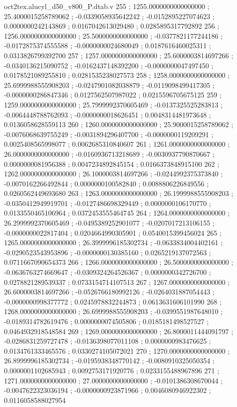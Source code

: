 \begin{filecontents}[overwrite]{oct2tex.alucyl_d50_v800_P.dtab.v}
255 ; 1255.0000000000000000 ; 25.4000015258789062 ; -0.0339058935642242 ; -0.0152895227074623 ; 0.0000000242143869 ; 0.0167042613029480 ; 0.0285895317792892
256 ; 1256.0000000000000000 ; 25.5000000000000000 ; -0.0377821177244186 ; -0.0172875374555588 ; -0.0000000024680049 ; 0.0187616460025311 ; 0.0313826799392700
257 ; 1257.0000000000000000 ; 25.6000003814697266 ; -0.0340136215090752 ; -0.0162437148392200 ; -0.0000000047497450 ; 0.0178521089255810 ; 0.0281535238027573
258 ; 1258.0000000000000000 ; 25.6999988555908203 ; -0.0247901082038879 ; -0.0119098499417305 ; -0.0000000286847346 ; 0.0127562507987022 ; 0.0215596705675125
259 ; 1259.0000000000000000 ; 25.7999992370605469 ; -0.0137325525283813 ; -0.0064448788762093 ; -0.0000000018626451 ; 0.0048314481973648 ; 0.0136058628559113
260 ; 1260.0000000000000000 ; 25.9000015258789062 ; -0.0076068639755249 ; -0.0031894296407700 ; -0.0000000119209291 ; 0.0025408565998077 ; 0.0062685310840607
261 ; 1261.0000000000000000 ; 26.0000000000000000 ; -0.0160936713218689 ; -0.0030937790870667 ; 0.0000000081956388 ; 0.0047234892845154 ; 0.0166373848915100
262 ; 1262.0000000000000000 ; 26.1000003814697266 ; -0.0244992375373840 ; -0.0070162266492844 ; 0.0000000100582840 ; 0.0088806226849556 ; 0.0260562449693680
263 ; 1263.0000000000000000 ; 26.1999988555908203 ; -0.0350412949919701 ; -0.0127486698329449 ; 0.0000000106170770 ; 0.0133550465106964 ; 0.0372453555464745
264 ; 1264.0000000000000000 ; 26.2999992370605469 ; -0.0495389252901077 ; -0.0207017213106155 ; -0.0000000022817404 ; 0.0204664990305901 ; 0.0540015399456024
265 ; 1265.0000000000000000 ; 26.3999996185302734 ; -0.0633834004402161 ; -0.0290523543953896 ; -0.0000000130385160 ; 0.0265219137072563 ; 0.0711667090654373
266 ; 1266.0000000000000000 ; 26.5000000000000000 ; -0.0636763274669647 ; -0.0309324264526367 ; 0.0000000342726700 ; 0.0278821289539337 ; 0.0733154714107513
267 ; 1267.0000000000000000 ; 26.6000003814697266 ; -0.0526766180992126 ; -0.0264031887054443 ; -0.0000000998377772 ; 0.0245978832244873 ; 0.0613631606101990
268 ; 1268.0000000000000000 ; 26.6999988555908203 ; -0.0399551987648010 ; -0.0189314782619476 ; 0.0000000074505806 ; 0.0185181498527527 ; 0.0464932918548584
269 ; 1269.0000000000000000 ; 26.8000011444091797 ; -0.0286831259727478 ; -0.0136398077011108 ; 0.0000000983476625 ; 0.0134761333465576 ; 0.0330274105072021
270 ; 1270.0000000000000000 ; 26.8999996185302734 ; -0.0195938348770142 ; -0.0080910325050354 ; 0.0000001102685943 ; 0.0092753171920776 ; 0.0233155488967896
271 ; 1271.0000000000000000 ; 27.0000000000000000 ; -0.0101386308670044 ; -0.0047622323036194 ; -0.0000000923871966 ; 0.0046080946922302 ; 0.0116058588027954

\end{filecontents}
